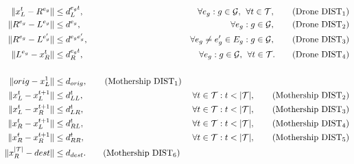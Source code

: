 
\begin{align*}
\|x_L^t- R^{e_g}\| & \leq  d_L^{e_gt},  &\forall e_g:g\in \mathcal{G}, \:\:\forall t\in \mathcal T, \tag{Drone DIST$_{1}$} \label{eq:drone-d1-async}\\
\|R^{e_g}- L^{e_g}\| & \leq  d^{e_g},  &\forall e_g:g\in \mathcal{G}, \tag{Drone DIST$_{2}$} \label{eq:drone-d2-async}\\
\|R^{e_g}- L^{e'_g}\| & \leq  d^{e_ge'_g}, &\forall e_g\neq e_g'\in E_g:g\in \mathcal{G}, \tag{Drone DIST$_{3}$} \label{eq:drone-d3-async}\\
\|L^{e_g}- x_R^t\| & \leq  d_R^{e_gt}, &\forall e_g:g\in \mathcal{G},\:\:\forall t\in \mathcal T. \tag{Drone DIST$_{4}$} \label{eq:drone-d4-async}\\\\
\|orig - x_L^1\| & \leq d_{orig}, \tag{Mothership DIST$_1$}\label{eq:mothership-d1-async}\\
\|x_L^t - x_L^{t+1}\| & \leq d_{LL}^{t}, &\forall t\in\mathcal T:t<|\mathcal T|, \tag{Mothership DIST$_{2}$}\label{eq:mothership-d2-async}\\
\|x_L^t - x_R^{t+1}\| & \leq d_{LR}^{t}, &\forall t\in\mathcal T:t<|\mathcal T|, \tag{Mothership DIST$_{3}$}\label{eq:mothership-d3-async}\\
\|x_R^t - x_L^{t+1}\| & \leq d_{RL}^{t}, &\forall t\in\mathcal T:t<|\mathcal T|, \tag{Mothership DIST$_{4}$}\label{eq:mothership-d4-async}\\
\|x_R^t - x_R^{t+1}\| & \leq d_{RR}^{t}, &\forall t\in\mathcal T:t<|\mathcal T|, \tag{Mothership DIST$_{5}$}\label{eq:mothership-d5-async}\\
\|x_R^{|\mathcal T|} - dest\| & \leq d_{dest}. \tag{Mothership DIST$_6$}\label{eq:mothership-d6-async}
\end{align*}

